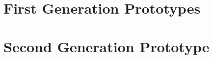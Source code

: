 \documentclass[a4paper,10pt]{article}
\begin{document}



\newpage\null\thispagestyle{empty}\newpage
\setcounter{page}{0}
\tableofcontents
{}
\restoregeometry%
\newpage

%
%
%
%
%
%
%
%
%
%
%
%	
%	
%	
%	
%

\section{First Generation Prototypes}
\label{sec:first_prototypes}







\clearpage

\section{Second Generation Prototype}
\label{sec:second_generation_prototype}






\end{document}
